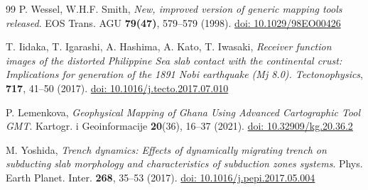 \documentclass{rrparticle}
\begin{document}
\begin{thebibliography}{99}
 P. Wessel, W.H.F. Smith, \emph{New, improved version of generic mapping tools released}. EOS Trans. AGU \textbf{79(47)}, 579--579 (1998). \href{https://doi.org/10.1029/98EO00426}{doi: 10.1029/98EO00426}

 T. Iidaka, T. Igarashi, A. Hashima, A. Kato, T. Iwasaki, \emph{{Receiver function images of the distorted Philippine Sea slab contact with the continental crust: Implications for generation of the 1891 Nobi earthquake (Mj 8.0)}. Tectonophysics}, \textbf{717}, 41--50 (2017). \href{https://doi.org/10.1016/j.tecto.2017.07.010}{doi: 10.1016/j.tecto.2017.07.010}

 P. Lemenkova, \emph{Geophysical Mapping of Ghana Using Advanced Cartographic Tool GMT}. Kartogr. i Geoinformacije \textbf{20}(36), 16--37 (2021). \href{https://doi.org/10.32909/kg.20.36.2}{doi: 10.32909/kg.20.36.2}

 M. Yoshida, \emph{Trench dynamics: Effects of dynamically migrating trench on subducting slab morphology and characteristics of subduction zones systems}. Phys. Earth Planet. Inter. \textbf{268}, 35--53 (2017). \href{https://doi.org/10.1016/j.pepi.2017.05.004}{doi: 10.1016/j.pepi.2017.05.004}

\end{thebibliography}
\end{document}
